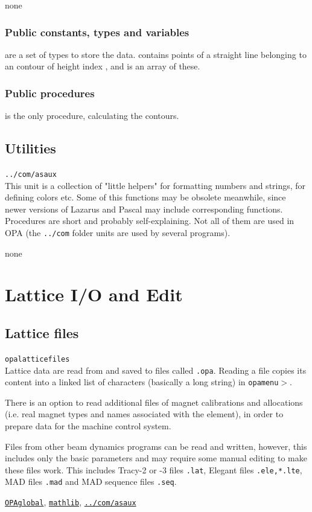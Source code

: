 \documentclass[12pt]{article}
\newcommand\code[1]{{\tt #1}}
\newcommand\guico[1]{{\color{blue}\code{#1}}}
\newcommand{\unico}[1]{{\color{burntorange}\code{#1}}}
\newcommand{\grcod}[2]{\opagui{#1}$>$\guico{#2}}
\newcommand{\opagui}[1]{\colorbox{blue!20}{\code{#1}}}
\newcommand{\opauni}[1]{\colorbox{orange!30}{\code{#1}}}
\newcommand{\ounih}[2]{\subsection{\label{#2}#1}{\Huge\opauni{#2}}\\}
\newcommand{\ouni}[1]{\hyperref[#1]{\opauni{#1}}}
\newcommand{\uses}[1]{\flushleft {\bf Uses:} #1}
\newcommand{\desc}[1]{#1}
\newcommand{\pvar}[1]{\subsubsection*{Public constants, types and variables} #1}
\newcommand{\ppro}[1]{\subsubsection*{Public procedures} #1}
\begin{document}
\uses{none}
\pvar{
\unico{Con...} are a set of types to store the data. \unico{ConLinesType} contains points of a straight line belonging to an contour of height index \unico{ih}, and \unico{ConLinesArray} is an array of these.
}
\ppro{
\unico{Conrec} is the only procedure, calculating the contours.}

\ounih{Utilities}{../com/asaux}

\desc{This unit is a collection of "little helpers" for formatting numbers and strings, for defining colors etc. Some of this functions may be obsolete meanwhile, since newer versions of Lazarus and Pascal may include corresponding functions.
Procedures are short and probably self-explaining. Not all of them are used in OPA (the \code{../com} folder units are used by several programs).}

\uses{none}

\section{\label{secedit}Lattice I/O and Edit} 

\ounih{Lattice files}{opalatticefiles}

\desc{Lattice data are read from and saved to files called \code{*.opa}. Reading a file copies its content into a linked list of characters (basically a long string) in \grcod{opamenu}{ReadFile}.

There is an option to read additional files of magnet calibrations and allocations (i.e. real magnet types and names associated with the element), in order to prepare data for the machine control system.

Files from other beam dynamics programs can be read and written, however, this includes only the basic parameters and may require some manual editing to make these files work. This includes Tracy-2 or -3 files \code{*.lat}, Elegant files \code{*.ele,*.lte}, MAD files \code{*.mad} and MAD sequence files \code{*.seq}.
}

\uses{\ouni{OPAglobal}, \ouni{mathlib}, \ouni{../com/asaux}}
\end{document}
